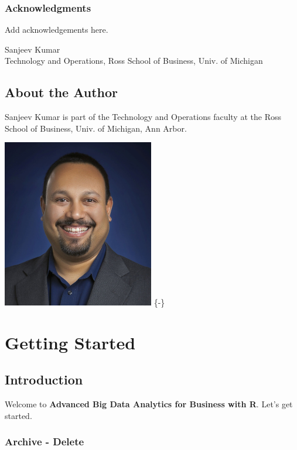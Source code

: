 \documentclass[]{krantz}
\theoremstyle{definition}
\theoremstyle{definition}
\theoremstyle{definition}
\theoremstyle{remark}
\let\BeginKnitrBlock\begin \let\EndKnitrBlock\end
\begin{document}
\section*{Acknowledgments}\label{acknowledgments}


Add acknowledgements here.

\BeginKnitrBlock{flushright}
Sanjeev Kumar\\
Technology and Operations, Ross School of Business, Univ. of Michigan
\EndKnitrBlock{flushright}

\chapter*{About the Author}\label{about-the-author}


Sanjeev Kumar is part of the Technology and Operations faculty at the
Ross School of Business, Univ. of Michigan, Ann Arbor.

\includegraphics[width=2.60417in]{images/SanjeevKumar.jpg} \{-\}

\mainmatter

\part{Getting Started}\label{part-getting-started}

\chapter{Introduction}\label{introduction}

Welcome to \textbf{Advanced Big Data Analytics for Business with R}.
Let's get started.

\section{Archive - Delete}\label{archive---delete}
\end{document}
